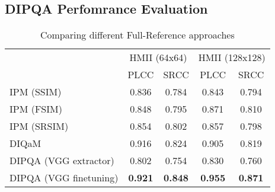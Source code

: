 \subsection{DIPQA Perfomrance Evaluation}
\begin{table}[ht]
  \centering
  \begin{tabular}{|l|cc|cc|}
    \hline
    \multirow{2}{*}{} & \multicolumn{2}{c|}{ HMII (64x64) } & \multicolumn{2}{c|}{ HMII (128x128) } \\ \cline{2-5} 
    & PLCC              & SRCC            & PLCC               & SRCC             \\ \hline
    IPM (SSIM)             & 0.836             & 0.784            & 0.843              & 0.794             \\
    IPM (FSIM)             & 0.848             & 0.795            & 0.871              & 0.810             \\
    IPM (SRSIM)            & 0.854             & 0.802            & 0.857              & 0.798             \\
    DIQaM                  & 0.916             & 0.824            & 0.905              & 0.819             \\
    DIPQA (VGG extractor)  & 0.802             & 0.754            & 0.830              & 0.760             \\
    DIPQA (VGG finetuning) & \textbf{0.921}    & \textbf{0.848}   & \textbf{0.955}     & \textbf{0.871}    \\ \hline
  \end{tabular}
  \caption{Comparing different Full-Reference approaches}
  \label{tab:approachs}
\end{table}
